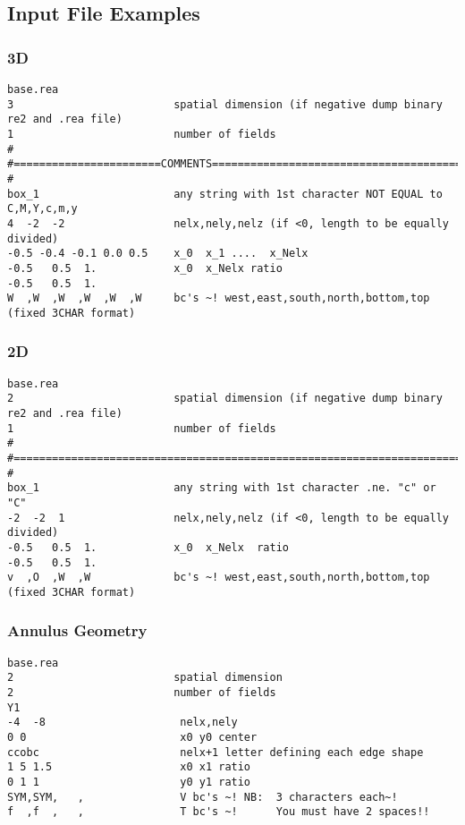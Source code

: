 \subsection{  Input File Examples }
\subsubsection{ 3D}
\begin{verbatim}base.rea
3                         spatial dimension (if negative dump binary re2 and .rea file)
1                         number of fields
#
#=======================COMMENTS============================================
#
box_1                     any string with 1st character NOT EQUAL to C,M,Y,c,m,y
4  -2  -2                 nelx,nely,nelz (if <0, length to be equally divided)
-0.5 -0.4 -0.1 0.0 0.5    x_0  x_1 ....  x_Nelx 
-0.5   0.5  1.            x_0  x_Nelx ratio
-0.5   0.5  1.
W  ,W  ,W  ,W  ,W  ,W     bc's ~! west,east,south,north,bottom,top (fixed 3CHAR format)
\end{verbatim}
\subsubsection{ 2D}
\begin{verbatim}base.rea
2                         spatial dimension (if negative dump binary re2 and .rea file)
1                         number of fields
#
#=======================================================================
#
box_1                     any string with 1st character .ne. "c" or "C"
-2  -2  1                 nelx,nely,nelz (if <0, length to be equally divided)
-0.5   0.5  1.            x_0  x_Nelx  ratio
-0.5   0.5  1.
v  ,O  ,W  ,W             bc's ~! west,east,south,north,bottom,top (fixed 3CHAR format)
\end{verbatim}
\subsubsection{ Annulus Geometry }
\begin{verbatim}base.rea
2                         spatial dimension
2                         number of fields
Y1
-4  -8                     nelx,nely
0 0                        x0 y0 center
ccobc                      nelx+1 letter defining each edge shape
1 5 1.5                    x0 x1 ratio
0 1 1                      y0 y1 ratio
SYM,SYM,   ,               V bc's ~! NB:  3 characters each~! 
f  ,f  ,   ,               T bc's ~!      You must have 2 spaces!!
\end{verbatim}
